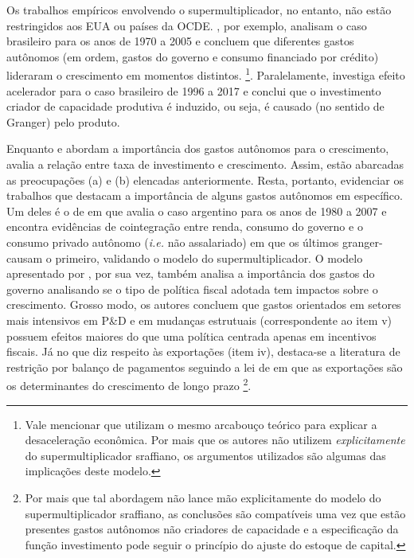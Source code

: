 Os trabalhos empíricos envolvendo o supermultiplicador, no entanto, não estão restringidos aos EUA ou países da OCDE. \textcite{freitas_pattern_2013}, por exemplo, analisam o caso brasileiro para os anos de 1970 a 2005 e concluem que diferentes gastos autônomos (em ordem, gastos do governo e consumo financiado por crédito) lideraram o crescimento em momentos distintos. \footnote{Vale mencionar que \textcite{serrano_demanda_2015} utilizam o mesmo arcabouço teórico para explicar a desaceleração econômica. Por mais que os autores não utilizem \textit{explicitamente} do supermultiplicador sraffiano, os argumentos utilizados são algumas das implicações deste modelo.}.  Paralelamente, \textcite{braga_investment_2018} investiga efeito acelerador para o caso brasileiro de 1996 a 2017 e conclui que o investimento criador de capacidade produtiva é induzido, ou seja, é causado (no sentido de Granger) pelo produto.  

Enquanto \textcite{freitas_pattern_2013} e \textcite{girardi_autonomous_2015} abordam a importância dos gastos autônomos para o crescimento, \textcite{braga_investment_2018} avalia a relação entre taxa de investimento e crescimento. Assim, estão abarcadas as preocupações (a) e (b) elencadas anteriormente. Resta, portanto, evidenciar os trabalhos que destacam a importância de alguns gastos autônomos em específico. Um deles é o de \textcite{medici_cointegration_2011} em que avalia o caso argentino para os anos de 1980 a 2007 e encontra evidências de cointegração entre renda, consumo do governo e o consumo privado autônomo (\textit{i.e.} não assalariado) em que os últimos granger-causam o primeiro, validando o modelo do supermultiplicador. O modelo apresentado por \textcite{deleidi_mission-oriented_2019}, por sua vez, também analisa a importância dos gastos do governo analisando se o tipo de política fiscal adotada tem impactos sobre o crescimento. Grosso modo, os autores concluem que gastos orientados em setores mais intensivos em P\&D e em mudanças estrutuais (correspondente ao item v) possuem efeitos maiores do que uma política centrada apenas em incentivos fiscais. Já no que diz respeito às exportações (item iv), destaca-se a literatura de restrição por balanço de pagamentos seguindo a lei de \textcite{mccombie_balance--payments_1994} 
em que as exportações são os determinantes do crescimento de longo prazo \cites{atesoglu_balance--payments-constrained_1993}{mccombie_empirics_1997}{moreno-brid_mexicos_1999}{bertola_balance--payments-constrained_2002}\footnote{Por mais que tal abordagem não lance mão explicitamente do modelo do supermultiplicador sraffiano, as conclusões são compatíveis uma vez que estão presentes gastos autônomos não criadores de capacidade e a especificação da função investimento pode seguir o princípio do ajuste do estoque de capital.}.

